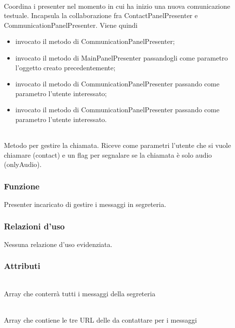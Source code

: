 \begin{description}
\item{}\\
Coordina i presenter nel momento in cui ha inizio una nuova comunicazione testuale. Incapsula la collaborazione fra ContactPanelPresenter e CommunicationPanelPresenter. Viene quindi
\begin{itemize}
\item invocato il metodo  di CommunicationPanelPresenter;
\item invocato il metodo  di MainPanelPresenter passandogli come parametro l'oggetto creato precedentemente;
\item invocato il metodo  di CommunicationPanelPresenter passando come parametro l'utente interessato;
\item invocato il metodo  di CommunicationPanelPresenter passando come parametro l'utente interessato.
\end{itemize} 

\item{}\\
Metodo per gestire la chiamata. Riceve come parametri l'utente che si vuole chiamare (contact) e un flag per segnalare se la chiamata è solo audio (onlyAudio).

\end{description}



\subsubsection*{Funzione}
Presenter incaricato di gestire i messaggi in segreteria.

\subsubsection*{Relazioni d'uso}
Nessuna relazione d'uso evidenziata.

\subsubsection*{Attributi}
\begin{description}
\item{}\\
Array che conterrà tutti i messaggi della segreteria
\item{}\\
Array che contiene le tre URL delle  da contattare per i messaggi
\end{description}

